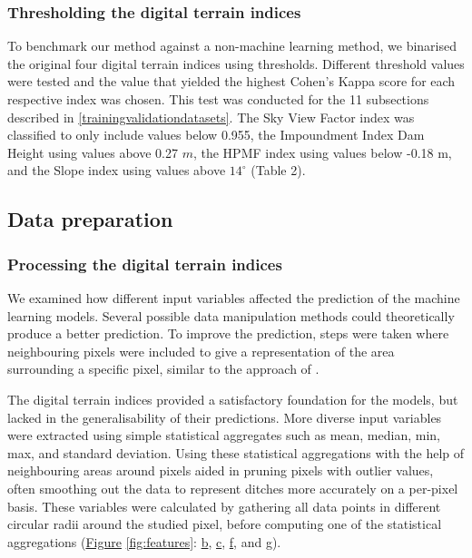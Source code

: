 \documentclass[]{interact}
\theoremstyle{plain}%
\theoremstyle{definition}
\theoremstyle{remark}
\begin{document}
\subsubsection{Thresholding the digital terrain indices}
To benchmark our method against a non-machine learning method, we binarised the original four digital terrain indices using thresholds. Different threshold values were tested and the value that yielded the highest Cohen's Kappa score for each respective index was chosen. This test was conducted for the 11 subsections described in \ref{trainingvalidationdatasets}. The Sky View Factor index was classified to only include values below 0.955, the Impoundment Index Dam Height using values above 0.27 $m$, the HPMF index using values below -0.18 m, and the Slope index using values above $14 ^{\circ}$ (Table 2). 

\subsection{Data preparation}

\subsubsection{Processing the digital terrain indices}
We examined how different  input variables affected the prediction of the machine learning models. Several possible data manipulation methods could theoretically produce a better prediction. To improve the prediction, steps were taken where neighbouring pixels were included to give a representation of the area surrounding a specific pixel, similar to the approach of \citet{roelens}. 

The digital terrain indices provided a satisfactory foundation for the models, but lacked in the generalisability of their predictions. More diverse input variables were extracted using simple statistical aggregates such as mean, median, min, max, and standard deviation. Using these statistical aggregations with the help of neighbouring areas around pixels aided in pruning pixels with outlier values, often smoothing out the data to represent ditches more accurately on a per-pixel basis. These variables were calculated by gathering all data points in different circular radii around the studied pixel, before computing one of the statistical aggregations (\hyperref[fig:features]{Figure} \ref{fig:features}: \hyperref[fig:features]{b}, \hyperref[fig:features]{c}, \hyperref[fig:features]{f}, and \hyperref[fig:features]{g}).
\end{document}
